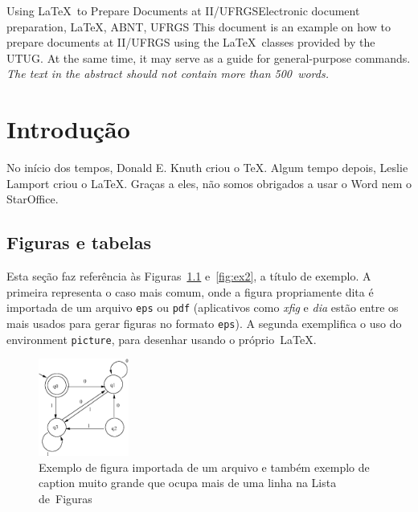 \documentclass[ppgc,mestrado]{iiufrgs}
\begin{document}
\begin{englishabstract}{Using \LaTeX\ to Prepare Documents at II/UFRGS}{Electronic document preparation, \LaTeX, ABNT, UFRGS}
This document is an example on how to prepare documents at II/UFRGS
using the \LaTeX\ classes provided by the UTUG\@. At the same time, it
may serve as a guide for general-purpose commands. \emph{The text in
the abstract should not contain more than 500~words.}
\end{englishabstract}


\chapter{Introdução}
No início dos tempos, Donald E. Knuth criou o \TeX. Algum tempo depois, Leslie Lamport criou o \LaTeX. Graças a eles, não somos obrigados a usar o Word nem o StarOffice.

\section{Figuras e tabelas}
Esta seção faz referência às Figuras~\ref{fig:ex1} e~\ref{fig:ex2}, a título de exemplo. A primeira representa o caso mais comum, onde a figura propriamente dita é importada de um arquivo \texttt{eps} ou \texttt{pdf} (aplicativos como \emph{xfig} e \emph{dia} estão entre os mais usados para gerar figuras no formato \texttt{eps}). A segunda exemplifica o uso do environment \texttt{picture}, para desenhar usando o próprio~\LaTeX.

\begin{figure}
        \centerline{\includegraphics[width=8em]{fig}}
        \caption{Exemplo de figura importada de um arquivo e também exemplo de caption muito grande que ocupa mais de uma linha na Lista de~Figuras}
        \label{fig:ex1}
\end{figure}
\end{document}
